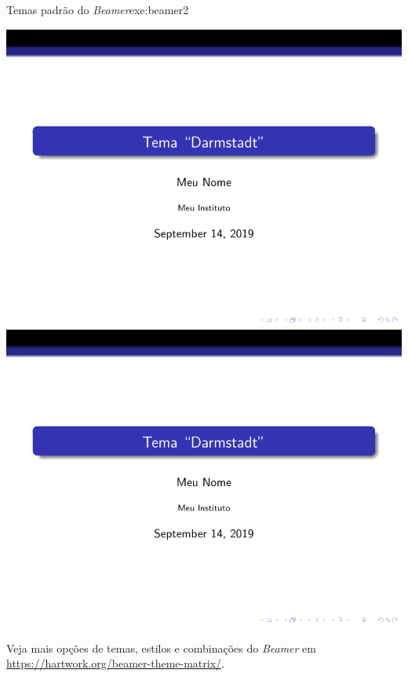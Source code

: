 \begin{texexptitled}{Temas padrão do \textit{Beamer}}{exe:beamer2}
\begin{tcbitemize}[raster columns=3,bicolor,
raster equal height,boxrule=0.1mm,
colframe=MaterialGreen900,colback=MaterialGrey50,
pdf comment]
\tcbitem[squeezed title={CambridgeUS}]\centering \includegraphics[scale=0.28,page=25]{./figs/beamer.pdf}
\tcbitem[squeezed title={Copenhagen}] \centering \includegraphics[scale=0.28,page=26]{./figs/beamer.pdf}

\end{tcbitemize}

\end{texexptitled}


\begin{marker}
Veja mais opções de temas, estilos e combinações do \textit{Beamer} em \url{https://hartwork.org/beamer-theme-matrix/}.
\end{marker}


